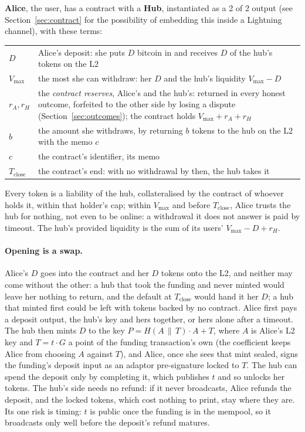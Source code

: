 \documentclass[11pt]{article}
\newcommand{\vmax}{V_{\max}}
\newcommand{\Tc}{T_{\mathrm{close}}}
\begin{document}
\textbf{Alice}, the user, has a contract with a \textbf{Hub}, instantiated as a 2 of 2 output  (see Section~\ref{sec:contract} for the possibility of embedding this inside a Lightning channel), with these terms:
\begin{center}
\small
\begin{tabularx}{\linewidth}{p{16mm}L}
\toprule
$D$ & Alice's deposit: she puts $D$ bitcoin in and receives $D$ of the hub's tokens on the L2 \\
$\vmax$ & the most she can withdraw: her $D$ and the hub's liquidity $\vmax - D$ \\
$r_A, r_H$ & the \emph{contract reserves}, Alice's and the hub's: returned in every honest outcome, forfeited to the other side by losing a dispute (Section~\ref{sec:outcomes}); the contract holds $\vmax + r_A + r_H$ \\
$b$ & the amount she withdraws, by returning $b$ tokens to the hub on the L2 with the memo $c$ \\
$c$ & the contract's identifier, its memo \\
$\Tc$ & the contract's end: with no withdrawal by then, the hub takes it \\
\bottomrule
\end{tabularx}
\end{center}
Every token is a liability of the hub, collateralised by the contract of whoever holds it, within that holder's cap; within $\vmax$ and before $\Tc$, Alice trusts the hub for nothing, not even to be online: a withdrawal it does not answer is paid by timeout. The hub's provided liquidity is the sum of its users'
$\vmax - D + r_H$.

\paragraph{Opening is a swap.} Alice's $D$ goes into the contract and her
$D$ tokens onto the L2, and neither may come without the other: a hub
that took the funding and never minted would leave her nothing to
return, and the default at $\Tc$ would hand it her $D$; a hub that
minted first could be left with tokens backed by no contract. Alice
first pays a deposit output, the hub's key and hers together, or hers
alone after a timeout. The hub then mints $D$ to the key
$P = H(A \,\|\, T)\cdot A + T$, where $A$ is Alice's L2 key and $T = t\cdot G$
a point of the funding transaction's own (the coefficient keeps Alice
from choosing $A$ against $T$), and Alice, once she sees that mint
sealed, signs the funding's deposit input as an adaptor pre-signature
locked to $T$. The hub can spend the deposit only by completing it,
which publishes $t$ and so unlocks her tokens. The hub's side needs no
refund: if it never broadcasts, Alice refunds the deposit, and the
locked tokens, which cost nothing to print, stay where they are. Its one
risk is timing: $t$ is public once the funding is in the mempool, so it
broadcasts only well before the deposit's refund matures.
\end{document}
